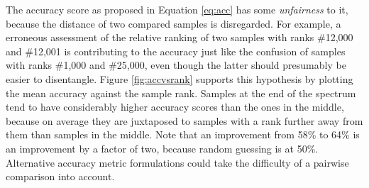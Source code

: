 The accuracy score as proposed in Equation \ref{eq:acc} has some \textit{unfairness} to it, because the distance of two compared samples is disregarded. For example, a erroneous assessment of the relative ranking of two samples with ranks \#12,000 and \#12,001 is contributing to the accuracy just like the confusion of samples with ranks \#1,000 and \#25,000, even though the latter should presumably be easier to disentangle. Figure \ref{fig:accvsrank} supports this hypothesis by plotting the mean accuracy against the sample rank. Samples at the end of the spectrum tend to have considerably higher accuracy scores than the ones in the middle, because on average they are juxtaposed to samples with a rank further away from them than samples in the middle. Note that an improvement from 58\% to 64\% is an improvement by a factor of two, because random guessing is at 50\%.
Alternative accuracy metric formulations could take the difficulty of a pairwise comparison into account.

